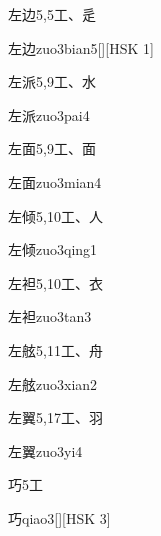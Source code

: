 \begin{entry}{左边}{5,5}{⼯、⾡}
  \begin{phonetics}{左边}{zuo3bian5}[][HSK 1]
  \end{phonetics}
\end{entry}

\begin{entry}{左派}{5,9}{⼯、⽔}
  \begin{phonetics}{左派}{zuo3pai4}
  \end{phonetics}
\end{entry}

\begin{entry}{左面}{5,9}{⼯、⾯}
  \begin{phonetics}{左面}{zuo3mian4}
  \end{phonetics}
\end{entry}

\begin{entry}{左倾}{5,10}{⼯、⼈}
  \begin{phonetics}{左倾}{zuo3qing1}
  \end{phonetics}
\end{entry}

\begin{entry}{左袒}{5,10}{⼯、⾐}
  \begin{phonetics}{左袒}{zuo3tan3}
  \end{phonetics}
\end{entry}

\begin{entry}{左舷}{5,11}{⼯、⾈}
  \begin{phonetics}{左舷}{zuo3xian2}
  \end{phonetics}
\end{entry}

\begin{entry}{左翼}{5,17}{⼯、⽻}
  \begin{phonetics}{左翼}{zuo3yi4}
  \end{phonetics}
\end{entry}

\begin{entry}{巧}{5}{⼯}
  \begin{phonetics}{巧}{qiao3}[][HSK 3]
  \end{phonetics}
\end{entry}

